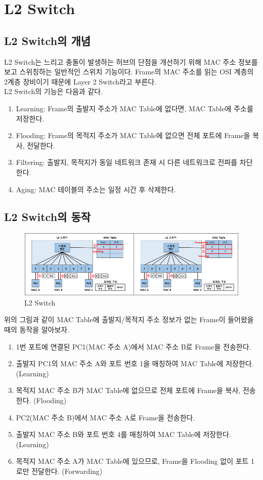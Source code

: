 \section{L2 Switch}
\subsection{L2 Switch의 개념}
    L2 Switch는 느리고 충돌이 발생하는 허브의 단점을 개선하기 위해 MAC 주소 정보를 보고 스위칭하는 일반적인 스위치 기능이다. Frame의 MAC 주소를 읽는 OSI 계층의 2계층 장비이기 때문에 Layer 2 Switch라고 부른다. \\
    
    L2 Switch의 기능은 다음과 같다. \\
    \begin{enumerate}
        \item Learning: Frame의 출발지 주소가 MAC Table에 없다면, MAC Table에 주소를 저장한다. 
        \item Flooding: Frame의 목적지 주소가 MAC Table에 없으면 전체 포트에 Frame을 복사, 전달한다.
        \item Filtering: 출발지, 목적지가 동일 네트워크 존재 시 다른 네트워크로 전파를 차단한다. 
        \item Aging: MAC 테이블의 주소는 일정 시간 후 삭제한다.
    \end{enumerate}
    
\subsection{L2 Switch의 동작}
    \vspace{-4mm}
    \begin{figure}[!h]\centering
		\includegraphics[width=.65\textwidth]{image/week05/4-1.png}
		\caption{\small L2 Switch}
		\vspace{-10pt}
    \end{figure}
    
    위의 그림과 같이 MAC Table에 출발지/목적지 주소 정보가 없는 Frame이 들어왔을때의 동작을 알아보자. \\
    \begin{enumerate}
        \item 1번 포트에 연결된 PC1(MAC 주소 A)에서 MAC 주소 B로 Frame을 전송한다.
        \item 출발지 PC1의 MAC 주소 A와 포트 번호 1을 매칭하여 MAC Table에 저장한다. (Learning)
        \item 목적지 MAC 주소 B가 MAC Table에 없으므로 전체 포트에 Frame을 복사, 전송한다. (Flooding)
        \item PC2(MAC 주소 B)에서 MAC 주소 A로 Frame을 전송한다.
        \item 출발지 MAC 주소 B와 포트 번호 4를 매칭하여 MAC Table에 저장한다. (Learning)
        \item 목적지 MAC 주소 A가 MAC Table에 있으므로, Frame을 Flooding 없이 포트 1로만 전달한다. (Forwarding)
    \end{enumerate}
\newpage